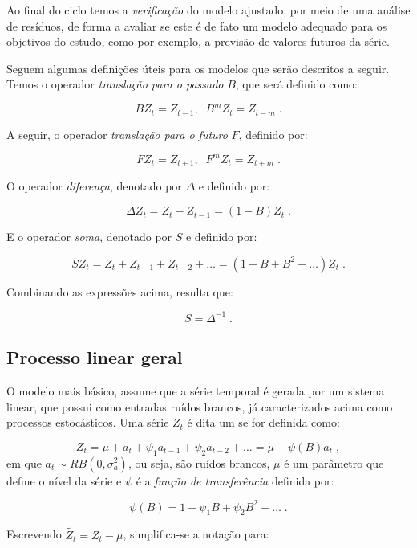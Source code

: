 Ao final do ciclo temos a \emph{verificação} do modelo ajustado, por meio de uma análise de resíduos, de forma a avaliar se este é de fato um modelo adequado para os objetivos do estudo, como por exemplo, a previsão de valores futuros da série.

Seguem algumas definições úteis para os modelos que serão descritos a seguir. Temos o operador \emph{translação para o passado} $B$, que será definido como:

\[ B Z_t = Z_{t-1} ,\;\; B^m Z_t = Z_{t-m}\;. \]

A seguir, o operador \emph{translação para o futuro} $F$, definido por:

\[ F Z_t = Z_{t+1} ,\;\; F^m Z_t = Z_{t+m}\;. \]

O operador \emph{diferença}, denotado por $\Delta$ e definido por:

\begin{equation}\label{series:diferenca} 
\Delta Z_t = Z_t - Z_{t-1} = (1 - B)Z_t\;.
\end{equation}

E o operador \emph{soma}, denotado por $S$ e definido por:

\[ S Z_t = Z_t + Z_{t-1} + Z_{t-2} + \ldots = (1 + B + B^2 + \ldots)Z_t\;. \]

Combinando as expressões acima, resulta que:

\[ S = \Delta^{-1}\;. \]

\subsection{Processo linear geral}

O modelo mais básico, assume que a série temporal é gerada por um sistema linear, que possui como entradas ruídos brancos, já caracterizados acima como processos estocásticos. Uma série $Z_t$ é dita um  se for definida como:

\begin{equation}\label{series:5.1}
Z_t = \mu + a_t + \psi_1 a_{t-1} + \psi_2 a_{t-2} + \ldots = \mu + \psi(B)a_t\;,
\end{equation}
em que $a_t \sim RB(0, \sigma_a^2)$, ou seja, são ruídos brancos, $\mu$ é um parâmetro que define o nível da série e $\psi$ é a \emph{função de transferência} definida por:

\[ \psi(B) = 1 + \psi_1 B + \psi_2 B^2 + \ldots\;. \]

Escrevendo $\tilde{Z_t} = Z_t - \mu$, simplifica-se a notação para:

